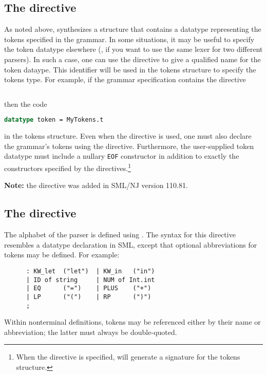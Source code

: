 \subsection{The  directive}

As noted above, \mlantlr{} synthesizes a structure that contains a datatype representing the
tokens specified in the grammar.
In some situations, it may be useful to specify the token datatype elsewhere (\eg{}, if you
want to use the same lexer for two different parsers).
In such a case, one can use the  directive to give a qualified name for the token
dataype.
This identifier will be used in the tokens structure to specify the tokens type.
For example, if the grammar specification contains the directive
\begin{lstlisting}[language=MLAntlr]
    %tokentype MyTokens.t;
\end{lstlisting}%
then the code
\begin{lstlisting}[language=SML]
    datatype token = MyTokens.t
\end{lstlisting}%
in the tokens structure.
Even when the  directive is used, one must also declare the grammar's tokens
using the  directive.
Furthermore, the user-supplied token datatype must include a nullary \texttt{EOF} constructor
in addition to exactly the constructors specified by the  directives.\footnote{
  When the  directive is specified, \mlantlr{} will generate a signature for
  the tokens structure.
}

\noindent{}\textbf{Note:} the  directive was added in SML/NJ version 110.81.

\subsection{The  directive}

The alphabet of the parser is defined using .  The syntax for this directive resembles a datatype declaration in SML, except that optional abbreviations for tokens may be defined.  For example:
\begin{lstlisting}[language=MLAntlr]
    %tokens
      : KW_let  ("let")  | KW_in   ("in")
      | ID of string     | NUM of Int.int
      | EQ      ("=")    | PLUS    ("+")
      | LP      ("(")    | RP      (")")
      ;
\end{lstlisting}%
Within nonterminal definitions, tokens may be referenced either by their name or abbreviation; the latter must always be double-quoted.

